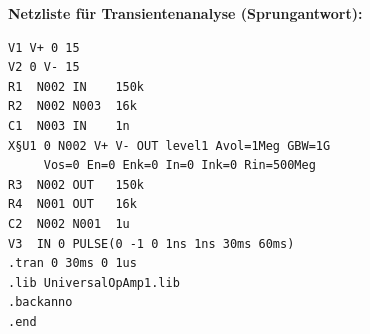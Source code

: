 \documentclass[12pt,a4paper]{article}
\begin{document}
\textbf{Netzliste für Transientenanalyse (Sprungantwort):}

\begin{verbatim}
V1 V+ 0 15
V2 0 V- 15
R1  N002 IN    150k
R2  N002 N003  16k
C1  N003 IN    1n
X§U1 0 N002 V+ V- OUT level1 Avol=1Meg GBW=1G
     Vos=0 En=0 Enk=0 In=0 Ink=0 Rin=500Meg
R3  N002 OUT   150k
R4  N001 OUT   16k
C2  N002 N001  1u
V3  IN 0 PULSE(0 -1 0 1ns 1ns 30ms 60ms)
.tran 0 30ms 0 1us
.lib UniversalOpAmp1.lib
.backanno
.end
\end{verbatim}
\end{document}
